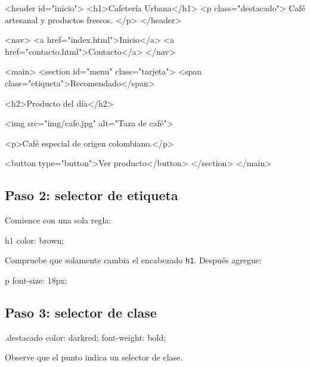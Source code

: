 \documentclass[11pt]{article}
\begin{document}
    \begin{htmlcodedark}
    <header id="inicio">
        <h1>Cafetería Urbana</h1>
        <p class="destacado">
        Café artesanal y productos frescos.
        </p>
    </header>

    <nav>
        <a href="index.html">Inicio</a>
        <a href="contacto.html">Contacto</a>
    </nav>

    <main>
        <section id="menu" class="tarjeta">
            <span class="etiqueta">Recomendado</span>

            <h2>Producto del día</h2>

            <img src="img/cafe.jpg"
            alt="Taza de café">

            <p>Café especial de origen colombiano.</p>

            <button type="button">Ver producto</button>
        </section>
    </main>
    \end{htmlcodedark}

    \subsection{Paso 2: selector de etiqueta}

    Comience con una sola regla:

    \begin{csscodedark}
        h1 {
            color: brown;
        }
    \end{csscodedark}

    Compruebe que solamente cambia el encabezado \texttt{h1}. Después agregue:

    \begin{csscodedark}
        p {
            font-size: 18px;
        }
    \end{csscodedark}


    \subsection{Paso 3: selector de clase}

    \begin{csscodedark}
        .destacado {
            color: darkred;
            font-weight: bold;
        }
    \end{csscodedark}

    Observe que el punto indica un selector de clase.
\end{document}
